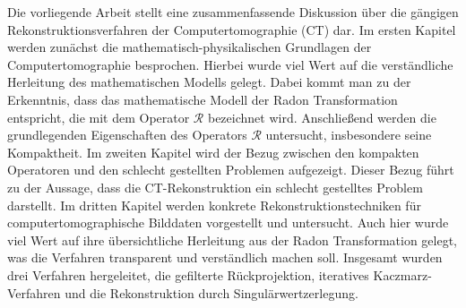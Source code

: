 Die vorliegende Arbeit stellt eine zusammenfassende Diskussion über die gängigen Rekonstruktionsverfahren der Computertomographie (CT) dar. Im ersten Kapitel werden zunächst die mathematisch-physikalischen Grundlagen der Computertomographie besprochen. Hierbei wurde viel Wert auf die verständliche Herleitung des mathematischen Modells gelegt. Dabei kommt man zu der Erkenntnis, dass das mathematische Modell der Radon Transformation entspricht, die mit dem Operator $\mathcal{R}$ bezeichnet wird. Anschließend werden die grundlegenden Eigenschaften des Operators $\mathcal{R}$ untersucht, insbesondere seine Kompaktheit. Im zweiten Kapitel wird der Bezug zwischen den kompakten Operatoren und den schlecht gestellten Problemen aufgezeigt. Dieser Bezug führt zu der Aussage, dass die CT-Rekonstruktion ein schlecht gestelltes Problem darstellt. Im dritten Kapitel werden konkrete Rekonstruktionstechniken für computertomographische Bilddaten vorgestellt und untersucht. Auch hier wurde viel Wert auf ihre übersichtliche Herleitung aus der Radon Transformation gelegt, was die Verfahren transparent und verständlich machen soll. Insgesamt wurden drei Verfahren hergeleitet, die gefilterte Rückprojektion, iteratives Kaczmarz-Verfahren und die Rekonstruktion durch Singulärwertzerlegung.